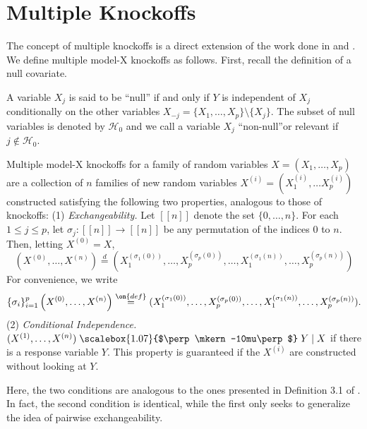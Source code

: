 \documentclass[12pt,reqno]{amsart}
\newcommand{\indep}{\mathrel{\text{\scalebox{1.07}{$\perp\mkern-10mu\perp$}}}}
\numberwithin{equation}{section}
\begin{document}
\section{Multiple Knockoffs}
The concept of multiple knockoffs is a direct extension of the work done in \cite{knockoffs} and \cite{panning}. We define multiple model-X knockoffs as follows. First, recall the definition of a null covariate.
\begin{defn}
A variable $X_j$ is said to be ``null'' if and only if $Y$ is independent of $X_j$ conditionally on the other variables $X_{-j} = \{ X_1, \ldots, X_p \} \setminus \{ X_j\}$. The subset of null variables is denoted by $\mathcal{H}_0$ and we call a variable $X_j$ ``non-null''or relevant if $j \not \in \mathcal{H}_0$.
\end{defn}
\begin{defn}
Multiple model-X knockoffs for a family of random variables $X = (X_1, \ldots, X_p)$ are a collection of $n$ families of new random variables $X^{(i)} = (X^{(i)}_1, \ldots X^{(i)}_p)$ constructed satisfying the following two properties, analogous to those of knockoffs: (1) \emph{Exchangeability.} Let $[[n]]$ denote the set $\{ 0, \ldots, n \}$. For each $1 \leq j \leq p$, let $\sigma_j : [[n]] \to [[n]]$ be any permutation of the indices $0$ to $n$. Then, letting $X^{(0)} = X$,
\begin{equation}
(X^{(0)}, \ldots, X^{(n)}) \overset{d}= (X^{(\sigma_1(0))}_{1}, \ldots, X^{(\sigma_p(0))}_{p}, \ldots, X^{(\sigma_1(n))}_{1}, \ldots, X^{(\sigma_p(n))}_{p}  )
\end{equation}
For convenience, we write
\begin{equation}
\{ \sigma_i \}_{i=1}^p \left( X^{(0)}, \ldots, X^{(n)} \right) \overset{\on{def}}{=} (X^{(\sigma_1(0))}_{1}, \ldots, X^{(\sigma_p(0))}_{p}, \ldots, X^{(\sigma_1(n))}_{1}, \ldots, X^{(\sigma_p(n))}_{p}  ).
\end{equation}
(2) \emph{Conditional Independence.} $(X^{(1)}, \ldots, X^{(n)}) \indep Y \mid X$ if there is a response variable $Y$. This property is guaranteed if the $X^{(i)}$ are constructed without looking at $Y$.
\end{defn}
Here, the two conditions are analogous to the ones presented in Definition 3.1 of \cite{panning}. In fact, the second condition is identical, while the first only seeks to generalize the idea of pairwise exchangeability.
\end{document}
